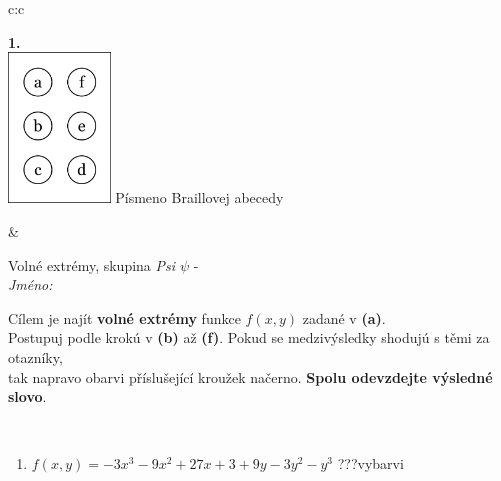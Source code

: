 \documentclass[10pt]{report}
\begin{document}
\begin{tabular}{c:c}
\begin{minipage}[c][104.5mm][t]{0.5\linewidth}
\begin{center}
\begin{minipage}{0.79\linewidth}
\begin{center}
\begin{varwidth}{\linewidth}
\begin{enumerate}
\end{enumerate}
\end{varwidth}
\end{center}
\end{minipage}
\begin{minipage}{0.20\linewidth}
\begin{center}
{\Huge\bfseries 1.} \\[2mm]
\includegraphics[height=40mm]{../images/braille.png}
{\small Písmeno Braillovej abecedy}
\end{center}
\end{minipage}
\end{center}
\end{minipage}
&
\begin{minipage}[c][104.5mm][t]{0.5\linewidth}
\begin{center}
\vspace{7mm}
{\huge Volné extrémy, skupina \textit{Psi $\psi$} -}\\[5mm]
\textit{Jméno:}\phantom{xxxxxxxxxxxxxxxxxxxxxxxxxxxxxxxxxxxxxxxxxxxxxxxxxxxxxxxxxxxxxxxxx}\\[5mm]
\begin{minipage}{0.95\linewidth}
\begin{center}
Cílem je najít \textbf{volné extrémy} funkce $f(x,y)$ zadané v \textbf{(a)}.\\Postupuj podle krokú v \textbf{(b)} až \textbf{(f)}. Pokud se medzivýsledky shodujú s těmi za otazníky,\\tak napravo obarvi příslušející kroužek načerno. \textbf{Spolu odevzdejte výsledné slovo}.
\end{center}
\end{minipage}
\\[1mm]
\begin{minipage}{0.79\linewidth}
\begin{center}
\begin{varwidth}{\linewidth}
\begin{enumerate}
\normalsize
\item $f(x,y)=-3x^3-9x^2+27x+3+9y-3y^2-y^3$\quad \dotfill\; ???\;\dotfill \quad vybarvi

\end{enumerate}
\end{varwidth}
\end{center}
\end{minipage}
\end{center}
\end{minipage}
\end{tabular}
\end{document}
